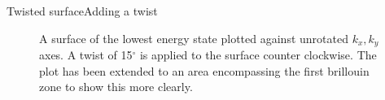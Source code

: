 \documentclass[9pt]{beamer}
\begin{document}
\begin{frame}{Twisted surface}{Adding a twist}
  \begin{figure}
    \centering
    \caption{A surface of the lowest energy state plotted against unrotated $k_x, k_y$ axes. A twist of 15$^\circ$ is applied to the surface counter clockwise. The plot has been extended to an area encompassing the first brillouin zone to show this more clearly.}
  \end{figure}
\end{frame}
\end{document}
